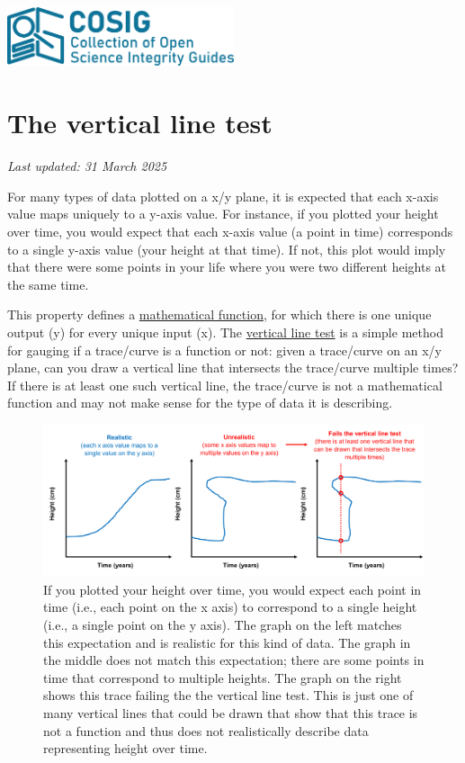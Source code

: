 \documentclass[letterpaper, 12pt]{article}
\begin{document}
\flushleft
\includegraphics[width=0.5\textwidth]{img/home/241017_final_logo_mockup.png}

\section*{The vertical line test}
\textit{Last updated: 31 March 2025}

For many types of data plotted on a x/y plane, it is expected that each x-axis value maps uniquely to a y-axis value. For instance, if you plotted your height over time, you would expect that each x-axis value (a point in time) corresponds to a single y-axis value (your height at that time). If not, this plot would imply that there were some points in your life where you were two different heights at the same time.

This property defines a \href{https://en.wikipedia.org/wiki/Graph_of_a_function}{mathematical function}, for which there is one unique output (y) for every unique input (x). The \href{https://en.wikipedia.org/wiki/Vertical_line_test}{vertical line test} is a simple method for gauging if a trace/curve is a function or not: given a trace/curve on an x/y plane, can you draw a vertical line that intersects the trace/curve multiple times? If there is at least one such vertical line, the trace/curve is not a mathematical function and may not make sense for the type of data it is describing.

\begin{figure}[h!tbp]
    \centering
    \includegraphics[width=\textwidth]{img/vertical_line/vertical_line_test_mockup.png}
    \caption*{If you plotted your height over time, you would expect each point in time (i.e., each point on the x axis) to correspond to a single height (i.e., a single point on the y axis). The graph on the left matches this expectation and is realistic for this kind of data. The graph in the middle does not match this expectation; there are some points in time that correspond to multiple heights. The graph on the right shows this trace failing the the vertical line test. This is just one of many vertical lines that could be drawn that show that this trace is not a function and thus does not realistically describe data representing height over time.}
\end{figure}
\end{document}
